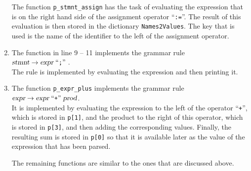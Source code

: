 \begin{enumerate}
      The function \texttt{p\_stmnt\_assign} has the task of evaluating the expression that is on the right
      hand side of the assignment operator ``\texttt{:=}''.  The result of this evaluation is then stored in the
      dictionary \texttt{Names2Values}.  The key that is used is the name of the identifier to the left of the
      assignment operator.
\item The function in line 9 -- 11 implements the grammar rule
      \\[0.2cm]
      \hspace*{1.3cm}
      $\textsl{stmnt} \rightarrow \textsl{expr} \;\mbox{``\texttt{;}''}\;$.
      \\[0.2cm]
      The rule is implemented by evaluating the expression and then printing it.
\item The function \texttt{p\_expr\_plus} implements the grammar rule
      \\[0.2cm]
      \hspace*{1.3cm}
      $\textsl{expr} \rightarrow \textsl{expr} \;\mbox{``\texttt{+}''}\; \textsl{prod}$.
      \\[0.2cm]
      It is implemented by evaluating the expression to the left of the operator ``\texttt{+}'', which is
      stored in \texttt{p[1]}, and the product to the right of this operator, which is stored in \texttt{p[3]},
      and then adding the corresponding values.  Finally, the resulting sum is stored in \texttt{p[0]} so that
      it is available later as the value of the expression that has been parsed.

      The remaining functions are similar to the ones that are discussed above.
\end{enumerate}

